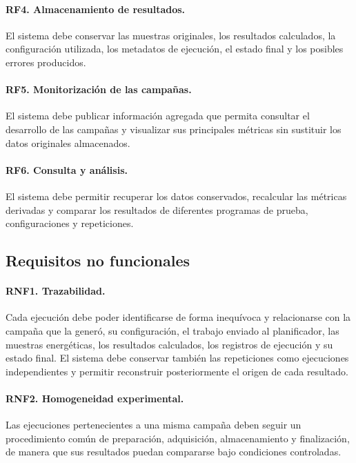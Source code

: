 \paragraph{RF4. Almacenamiento de resultados.}
El sistema debe conservar las muestras originales, los resultados calculados, la configuración utilizada, los metadatos de ejecución, el estado final y los posibles errores producidos.

\paragraph{RF5. Monitorización de las campañas.}
El sistema debe publicar información agregada que permita consultar el desarrollo de las campañas y visualizar sus principales métricas sin sustituir los datos originales almacenados.

\paragraph{RF6. Consulta y análisis.}
El sistema debe permitir recuperar los datos conservados, recalcular las métricas derivadas y comparar los resultados de diferentes programas de prueba, configuraciones y repeticiones.

\subsection{Requisitos no funcionales}

\paragraph{RNF1. Trazabilidad.}
Cada ejecución debe poder identificarse de forma inequívoca y relacionarse con la campaña que la generó, su configuración, el trabajo enviado al planificador, las muestras energéticas, los resultados calculados, los registros de ejecución y su estado final. El sistema debe conservar también las repeticiones como ejecuciones independientes y permitir reconstruir posteriormente el origen de cada resultado.

\paragraph{RNF2. Homogeneidad experimental.}
Las ejecuciones pertenecientes a una misma campaña deben seguir un procedimiento común de preparación, adquisición, almacenamiento y finalización, de manera que sus resultados puedan compararse bajo condiciones controladas.

